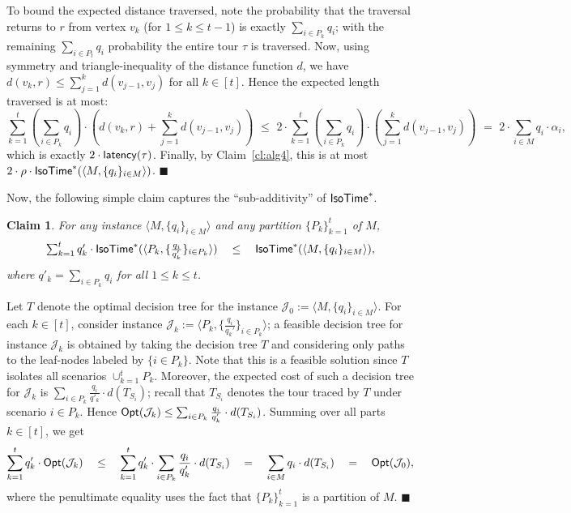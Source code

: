 \documentclass[11pt]{article}
\newtheorem{claim}[thm]{Claim}
\def\opt{{\sf Opt}\xspace}
\def\js{\ensuremath{\mathcal{J}}}
\def\latency{{\sf latency}}
\def\isotime{\ensuremath{{\sf IsoTime}}}
\def\isoopt{{\isotime}^*}
\def\ts{\textstyle}
\newenvironment{pf}{

\noindent{\bf Proof:}} {\hfill$\blacksquare$


}
\begin{document}
\begin{pf}
To bound the expected distance traversed, note the probability that  the traversal returns to $r$ from vertex $v_k$
(for $1\le k\le t-1$)  is exactly $\sum_{i\in P_k} q_i$; with the remaining $\sum_{i\in P_t} q_i$ probability the
entire tour $\tau$ is traversed. Now, using symmetry and triangle-inequality of the distance function $d$, we have $d(v_k,r)\le \sum_{j=1}^k   d(v_{j-1},v_j)$ for all $k\in[t]$. Hence the  expected length traversed is at most:
$$\sum_{k=1}^t \left(\sum_{i\in P_k} q_i \right) \cdot \left(d(v_k,r)+\sum_{j=1}^k
  d(v_{j-1},v_j)\right) \,\,\le \,\,
  2\cdot \sum_{k=1}^t \left(\sum_{i\in P_k} q_i \right) \cdot \left(\sum_{j=1}^k
  d(v_{j-1},v_j)\right)  \,\,=  \,\,2\cdot \sum_{i\in M} q_i\cdot \alpha_i,$$ 
  which is exactly $2\cdot
  \latency(\tau)$.
Finally, by Claim~\ref{cl:alg4}, this is at most $2\cdot \rho\cdot \isoopt(\langle M,
    \{q_i\}_{i\in M}\rangle)$.
\end{pf}



Now, the following simple claim captures the ``sub-additivity'' of $\isoopt$.
\begin{claim}\label{cl:alg3}
  For any instance $\langle M, \{q_i\}_{i\in
    M}\rangle$ and any partition  $\{P_k\}_{k=1}^t$ of $M$,
  \begin{gather}
    \ts \sum_{k=1}^t q'_k \cdot \isoopt(\langle P_k,
    \{\frac{q_i}{q'_k}\}_{i\in P_k}\rangle)\quad \le \quad \isoopt(\langle M,
    \{q_i\}_{i\in M}\rangle),
  \end{gather}
  where $q'_k = \sum_{i\in P_k} q_i$ for all $1\le k\le t$.
\end{claim}
\begin{pf}
Let $T$ denote the optimal decision tree for the instance
  $\js_0:=\langle M, \{q_i\}_{i\in M}\rangle$. For each $k\in [t]$,
  consider instance $\js_k:=\langle P_k, \{\frac{q_i}{q_k'}\}_{i\in
    P_k}\rangle$; a feasible decision tree for instance $\js_k$
  is obtained by taking the decision tree $T$ and considering only paths to
  the leaf-nodes labeled by $\{i\in P_k\}$. Note that this is a feasible
  solution since $T$ isolates all scenarios $\cup_{k=1}^t P_k$.
  Moreover, the expected cost of such a  decision tree for $\js_k$ is $\sum_{i\in
    P_k}\frac{q_i}{q'_k}\cdot d(T_{S_i})$; recall that $T_{S_i}$ denotes the tour traced
    by $T$ under scenario $i\in P_k$. Hence $\opt(\js_k)\le
  \sum_{i\in P_k}\frac{q_i}{q'_k}\cdot d(T_{S_i})$.  Summing over all
  parts $k\in [t]$, we get
  \begin{gather}
    \sum_{k=1}^t q'_k \cdot \opt(\js_k) \quad \le  \quad \sum_{k=1}^t q'_k \cdot
    \sum_{i\in P_k}\frac{q_i}{q'_k}\cdot d(T_{S_i}) \quad = \quad \sum_{i\in M} q_i\cdot
    d(T_{S_i}) \quad = \quad \opt(\js_0),
  \end{gather}
  where the penultimate equality uses the fact that $\{P_k\}_{k=1}^t$ is
  a partition of $M$.
\end{pf}
\end{document}
